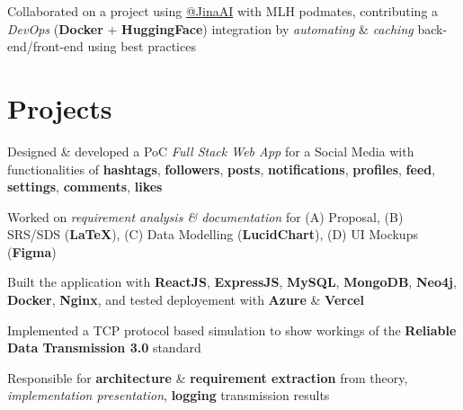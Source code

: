 \documentclass[]{deedy-resume-openfont}
\begin{document}
\begin{minipage}[t]{0.65\textwidth}
\begin{tightemize}
    \item Collaborated on a project using \href{https://github.com/georgeamccarthy/protein_search/pull/30}{@JinaAI} with MLH podmates, contributing a \textit{DevOps} (\textbf{Docker} + \textbf{HuggingFace}) integration by \textit{automating} \& \textit{caching} back-end/front-end using best practices    
\end{tightemize}


\section{Projects}
\begin{tightemize}
    \item Designed \& developed a PoC \textit{Full Stack Web App} for a Social Media with functionalities of \textbf{hashtags}, \textbf{followers}, \textbf{posts}, \textbf{notifications}, \textbf{profiles}, \textbf{feed}, \textbf{settings}, \textbf{comments}, \textbf{likes} \\
    
    \item Worked on \textit{requirement analysis \& documentation} for (A) Proposal, (B) SRS/SDS (\textbf{LaTeX}), (C) Data Modelling (\textbf{LucidChart}), (D) UI Mockups (\textbf{Figma}) \\
    
    \item Built the application with \textbf{ReactJS}, \textbf{ExpressJS}, \textbf{MySQL}, \textbf{MongoDB}, \textbf{Neo4j}, \textbf{Docker}, \textbf{Nginx}, and tested deployement with  \textbf{Azure} \& \textbf{Vercel} \\
\end{tightemize}
\sectionsep

\begin{tightemize}
    \item Implemented a TCP protocol based simulation to show workings of the \textbf{Reliable Data Transmission 3.0} standard \\

    \item Responsible for \textbf{architecture} \& \textbf{requirement extraction} from theory, \textit{implementation presentation}, \textbf{logging} transmission results
\end{tightemize}
\sectionsep


\end{minipage}
\end{document}
